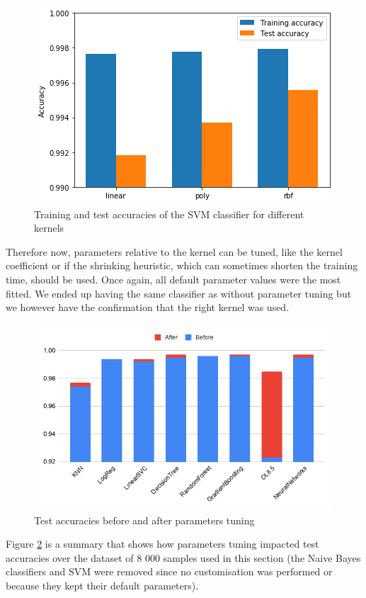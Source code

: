 \begin{itemize}
    \begin{figure}
    \centering
      \includegraphics[width=0.80\linewidth]{Figures/svm_kernel.png}
      \captionsetup{justification=centering}
      \caption{Training and test accuracies of the SVM classifier for different kernels}
      \label{fig:svm_kernel}
    \end{figure}
    Therefore now, parameters relative to the kernel can be tuned, like the kernel coefficient or if the shrinking heuristic, which can sometimes shorten the training time, should be used. Once again, all default parameter values were the most fitted. We ended up having the same classifier as without parameter tuning but we however have the confirmation that the right kernel was used.
\end{itemize}

\begin{figure}[]
\centering
  \includegraphics[width=0.80\linewidth]{Figures/parameter_tuning.png}
  \caption{Test accuracies before and after parameters tuning}
  \label{fig:param_tuning}
\end{figure}
Figure \ref{fig:param_tuning} is a summary that shows how parameters tuning impacted test accuracies over the dataset of 8 000 samples used in this section (the Naive Bayes classifiers and SVM were removed since no customisation was performed or because they kept their default parameters).

